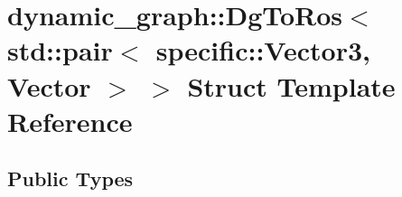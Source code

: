 \hypertarget{structdynamic__graph_1_1DgToRos_3_01std_1_1pair_3_01specific_1_1Vector3_00_01Vector_01_4_01_4}{}\section{dynamic\+\_\+graph\+:\+:Dg\+To\+Ros$<$ std\+:\+:pair$<$ specific\+:\+:Vector3, Vector $>$ $>$ Struct Template Reference}
\label{structdynamic__graph_1_1DgToRos_3_01std_1_1pair_3_01specific_1_1Vector3_00_01Vector_01_4_01_4}
\subsection*{Public Types}
